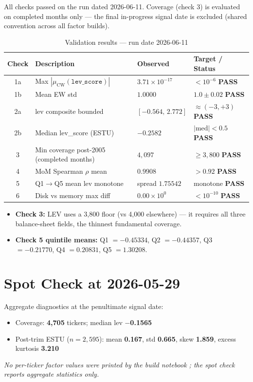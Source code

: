 \documentclass[11pt,a4paper]{article}
\newcommand{\PASS}[1]{\textcolor{pass}{\textbf{#1}}}
\newcommand{\NOTE}[1]{\textcolor{note}{\textit{#1}}}
\begin{document}
All checks passed on the run dated 2026-06-11. Coverage (check 3) is evaluated
on completed months only --- the final in-progress signal date is excluded
(shared convention across all factor builds).

\begin{table}[h!]
\centering
\caption{Validation results --- run date 2026-06-11}
\small
\begin{tabular}{clll}
\toprule
\textbf{Check} & \textbf{Description} & \textbf{Observed} & \textbf{Target / Status} \\
\midrule
1a & Max $|\mu_{\text{CW}}(\texttt{lev\_score})|$ & $3.71\times10^{-17}$ & $<10^{-6}$ \quad \PASS{PASS} \\
1b & Mean EW std & $1.0000$ & $1.0\pm0.02$ \quad \PASS{PASS} \\
2a & lev composite bounded & $[-0.564,\,2.772]$ & $\approx(-3,+3)$ \quad \PASS{PASS} \\
2b & Median lev\_score (ESTU) & $-0.2582$ & $|\text{med}|<0.5$ \quad \PASS{PASS} \\
3 & Min coverage post-2005 (completed months) & $4{,}097$ & $\geq3{,}800$ \quad \PASS{PASS} \\
4 & MoM Spearman $\rho$ mean & $0.9908$ & $>0.92$ \quad \PASS{PASS} \\
5 & Q1$\to$Q5 mean lev monotone & spread $1.75542$ & monotone \quad \PASS{PASS} \\
6 & Disk vs memory max diff & $0.00\times10^{0}$ & $<10^{-10}$ \quad \PASS{PASS} \\
\bottomrule
\end{tabular}
\end{table}

\begin{itemize}[leftmargin=*,topsep=2pt,itemsep=2pt]
  \item \textbf{Check 3:} LEV uses a 3{,}800 floor (vs 4{,}000 elsewhere) --- it requires all three balance-sheet fields, the thinnest fundamental coverage.
  \item \textbf{Check 5 quintile means:} Q1 $=-0.45334$, Q2 $=-0.44357$, Q3 $=-0.21770$, Q4 $=0.20831$, Q5 $=1.30208$.
\end{itemize}

\section{Spot Check at 2026-05-29}

Aggregate diagnostics at the penultimate signal date:

\begin{itemize}[leftmargin=*,topsep=2pt,itemsep=2pt]
  \item Coverage: \textbf{4{,}705} tickers; median lev \textbf{$-$0.1565}
  \item Post-trim ESTU ($n=2{,}595$): mean \textbf{0.167}, std \textbf{0.665}, skew \textbf{1.859}, excess kurtosis \textbf{3.210}
\end{itemize}

\NOTE{No per-ticker factor values were printed by the build notebook
; the spot check reports aggregate statistics only.}
\end{document}
